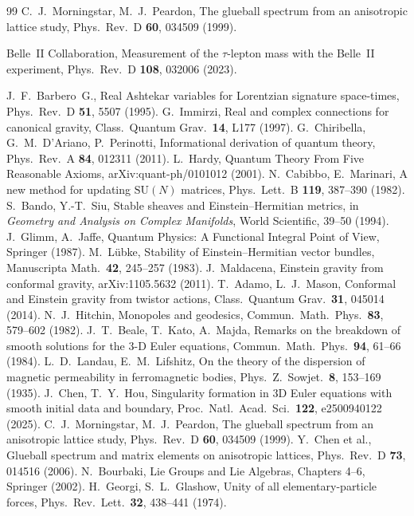 \documentclass[11pt,a4paper]{article}
\theoremstyle{definition}
\theoremstyle{remark}
\newcommand{\SU}{\mathrm{SU}}
\begin{document}
\begin{thebibliography}{99}
 C.~J.~Morningstar, M.~J.~Peardon, The glueball spectrum from an anisotropic lattice study, Phys.\ Rev.\ D \textbf{60}, 034509 (1999).

 Belle~II Collaboration, Measurement of the $\tau$-lepton mass with the Belle~II experiment, Phys.\ Rev.\ D \textbf{108}, 032006 (2023).

 J.~F.~Barbero~G., Real Ashtekar variables for Lorentzian signature space-times, Phys.\ Rev.\ D \textbf{51}, 5507 (1995).
 G.~Immirzi, Real and complex connections for canonical gravity, Class.\ Quantum Grav.\ \textbf{14}, L177 (1997).
 G.~Chiribella, G.~M.~D'Ariano, P.~Perinotti, Informational derivation of quantum theory, Phys.\ Rev.\ A \textbf{84}, 012311 (2011).
 L.~Hardy, Quantum Theory From Five Reasonable Axioms, arXiv:quant-ph/0101012 (2001).
 N.~Cabibbo, E.~Marinari, A new method for updating $\SU(N)$ matrices, Phys.\ Lett.\ B \textbf{119}, 387--390 (1982).
 S.~Bando, Y.-T.~Siu, Stable sheaves and Einstein--Hermitian metrics, in \emph{Geometry and Analysis on Complex Manifolds}, World Scientific, 39--50 (1994).
 J.~Glimm, A.~Jaffe, Quantum Physics: A Functional Integral Point of View, Springer (1987).
 M.~L\"ubke, Stability of Einstein--Hermitian vector bundles, Manuscripta Math.\ \textbf{42}, 245--257 (1983).
 J.~Maldacena, Einstein gravity from conformal gravity, arXiv:1105.5632 (2011).
 T.~Adamo, L.~J.~Mason, Conformal and Einstein gravity from twistor actions, Class.\ Quantum Grav.\ \textbf{31}, 045014 (2014).
 N.~J.~Hitchin, Monopoles and geodesics, Commun.\ Math.\ Phys.\ \textbf{83}, 579--602 (1982).
 J.~T.~Beale, T.~Kato, A.~Majda, Remarks on the breakdown of smooth solutions for the $3$-D Euler equations, Commun.\ Math.\ Phys.\ \textbf{94}, 61--66 (1984).
 L.~D.~Landau, E.~M.~Lifshitz, On the theory of the dispersion of magnetic permeability in ferromagnetic bodies, Phys.\ Z.\ Sowjet.\ \textbf{8}, 153--169 (1935).
 J.~Chen, T.~Y.~Hou, Singularity formation in $3$D Euler equations with smooth initial data and boundary, Proc.\ Natl.\ Acad.\ Sci.\ \textbf{122}, e2500940122 (2025).
 C.~J.~Morningstar, M.~J.~Peardon, The glueball spectrum from an anisotropic lattice study, Phys.\ Rev.\ D \textbf{60}, 034509 (1999).
 Y.~Chen et al., Glueball spectrum and matrix elements on anisotropic lattices, Phys.\ Rev.\ D \textbf{73}, 014516 (2006).
 N.~Bourbaki, Lie Groups and Lie Algebras, Chapters 4--6, Springer (2002).
 H.~Georgi, S.~L.~Glashow, Unity of all elementary-particle forces, Phys.\ Rev.\ Lett.\ \textbf{32}, 438--441 (1974).


\end{thebibliography}
\end{document}
